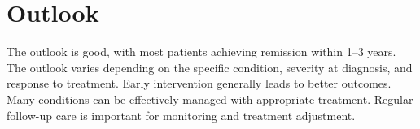 \section{Outlook}
The outlook is good, with most patients achieving remission within 1--3 years. The outlook varies depending on the specific condition, severity at diagnosis, and response to treatment. Early intervention generally leads to better outcomes. Many conditions can be effectively managed with appropriate treatment. Regular follow-up care is important for monitoring and treatment adjustment.
